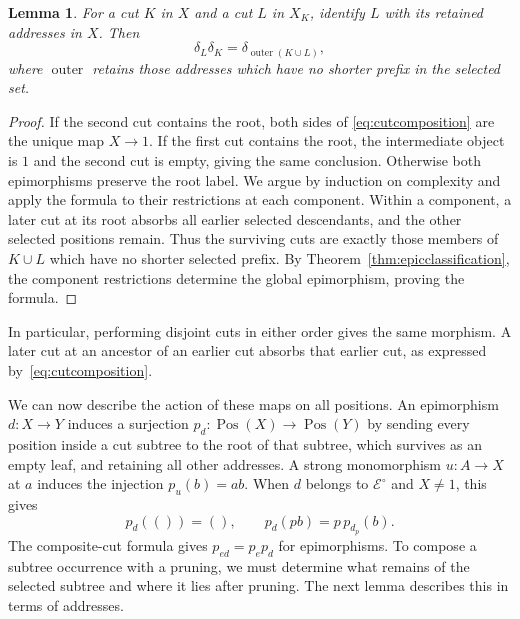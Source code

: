 \documentclass[11pt,a4paper]{article}
\theoremstyle{plain}
\newtheorem{lemma}[theorem]{Lemma}
\theoremstyle{definition}
\theoremstyle{remark}
\newcommand{\Icat}{\mathcal E^\circ}
\newcommand{\one}{1}
\newcommand{\Pos}{\operatorname{Pos}}
\newcommand{\emptyword}{()}
\begin{document}
\begin{lemma}\label{prop:cutcomposition}
For a cut $K$ in $X$ and a cut $L$ in $X_K$, identify $L$ with its
retained addresses in $X$. Then
\begin{equation}\label{eq:cutcomposition}
 \delta_L\delta_K=\delta_{\operatorname{outer}(K\cup L)},
\end{equation}
where $\operatorname{outer}$ retains those addresses which have
no shorter prefix in the selected set.
\end{lemma}
\begin{proof}
If the second cut contains the root, both sides of
\eqref{eq:cutcomposition} are the unique map $X\to\one$. If the
first cut contains the root, the intermediate object is $\one$ and
the second cut is empty, giving the same conclusion. Otherwise both
epimorphisms preserve the root label. We argue by induction on
complexity and apply the formula to their restrictions at each
component. Within a component, a later cut at its root absorbs
all earlier selected descendants, and the other selected positions
remain. Thus the surviving cuts are exactly those members of
$K\cup L$ which have no shorter selected prefix. By
Theorem~\ref{thm:epicclassification}, the component restrictions
determine the global epimorphism, proving the formula.
\end{proof}

In particular, performing disjoint cuts in either order gives the
same morphism. A later cut at an ancestor of an earlier cut absorbs
that earlier cut, as expressed by~\eqref{eq:cutcomposition}.

\label{not:position-maps}
We can now describe the action of these maps on all positions.
An epimorphism $d:X\to Y$ induces a surjection
$p_d:\Pos(X)\to\Pos(Y)$ by sending every position inside a cut
subtree to the root of that subtree, which survives as an empty
leaf, and retaining all other addresses. A strong monomorphism
$u:A\to X$ at $a$ induces the injection $p_u(b)=ab$.
When $d$ belongs to $\Icat$ and $X\ne\one$, this gives
\[
p_d(\emptyword)=\emptyword,\qquad p_d(pb)=p\,p_{d_p}(b).
\]
The composite-cut formula gives $p_{ed}=p_ep_d$ for epimorphisms.
To compose a subtree occurrence with a pruning, we must determine
what remains of the selected subtree and where it lies after
pruning. The next lemma describes this in terms of addresses.
\end{document}
